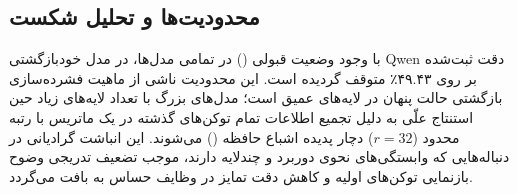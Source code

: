 \subsection{محدودیت‌ها و تحلیل شکست}
با وجود وضعیت قبولی () در تمامی مدل‌ها، در مدل خودبازگشتی Qwen دقت ثبت‌شده بر روی ۴۹.۴۳٪ متوقف گردیده است. این محدودیت ناشی از ماهیت فشرده‌سازی بازگشتی حالت پنهان در لایه‌های عمیق است؛ مدل‌های بزرگ با تعداد لایه‌های زیاد حین استنتاج علّی به دلیل تجمیع اطلاعات تمام توکن‌های گذشته در یک ماتریس با رتبه محدود ($r=32$) دچار پدیده اشباع حافظه () می‌شوند. این انباشت گرادیانی در دنباله‌هایی که وابستگی‌های نحوی دوربرد و چندلایه دارند، موجب تضعیف تدریجی وضوح بازنمایی توکن‌های اولیه و کاهش دقت تمایز در وظایف حساس به بافت می‌گردد.
